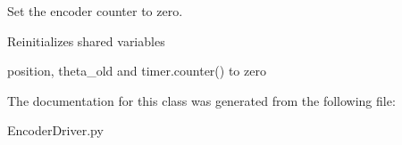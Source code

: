 Set the encoder counter to zero. 

Reinitializes shared variables \begin{DoxyVerb}   position, theta_old and timer.counter() to zero\end{DoxyVerb}
 

The documentation for this class was generated from the following file\+:\begin{DoxyCompactItemize}
\item 
Encoder\+Driver.\+py\end{DoxyCompactItemize}
